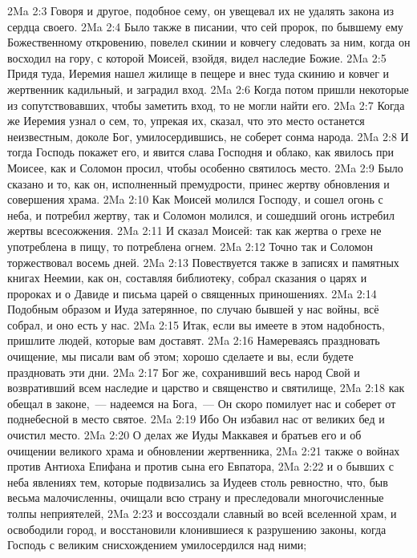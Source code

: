 \vs 2Ma 2:3 Говоря и другое, подобное сему, он увещевал их не удалять закона из сердца своего.
\vs 2Ma 2:4 Было также в писании, что сей пророк, по бывшему ему Божественному откровению, повелел скинии и ковчегу следовать за ним, когда он восходил на гору, с которой Моисей, взойдя, видел наследие Божие.
\vs 2Ma 2:5 Придя туда, Иеремия нашел жилище в пещере и внес туда скинию и ковчег и жертвенник кадильный, и заградил вход.
\vs 2Ma 2:6 Когда потом пришли некоторые из сопутствовавших, чтобы заметить вход, то не могли найти его.
\vs 2Ma 2:7 Когда же Иеремия узнал о сем, то, упрекая их, сказал, что это место останется неизвестным, доколе Бог, умилосердившись, не соберет сонма народа.
\vs 2Ma 2:8 И тогда Господь покажет его, и явится слава Господня и облако, как явилось при Моисее, как и Соломон просил, чтобы особенно святилось место.
\vs 2Ma 2:9 Было сказано и то, как он, исполненный премудрости, принес жертву обновления и совершения храма.
\vs 2Ma 2:10 Как Моисей молился Господу, и сошел огонь с неба, и потребил жертву, так и Соломон молился, и сошедший огонь истребил жертвы всесожжения.
\vs 2Ma 2:11 И сказал Моисей: так как жертва о грехе не употреблена в пищу, то потреблена огнем.
\vs 2Ma 2:12 Точно так и Соломон торжествовал восемь дней.
\rsbpar\vs 2Ma 2:13 Повествуется также в записях и памятных книгах Неемии, как он, составляя библиотеку, собрал сказания о царях и пророках и о Давиде и письма царей о священных приношениях.
\vs 2Ma 2:14 Подобным образом и Иуда затерянное, по случаю бывшей у нас войны, всё собрал, и оно есть у нас.
\vs 2Ma 2:15 Итак, если вы имеете в этом надобность, пришлите людей, которые вам доставят.
\vs 2Ma 2:16 Намереваясь праздновать очищение, мы писали вам об этом; хорошо сделаете и вы, если будете праздновать эти дни.
\vs 2Ma 2:17 Бог же, сохранивший весь народ Свой и возвративший всем наследие и царство и священство и святилище,
\vs 2Ma 2:18 как обещал в законе,~--- надеемся на Бога,~--- Он скоро помилует нас и соберет от поднебесной в место святое.
\vs 2Ma 2:19 Ибо Он избавил нас от великих бед и очистил место.
\vs 2Ma 2:20 О делах же Иуды Маккавея и братьев его и об очищении великого храма и обновлении жертвенника,
\vs 2Ma 2:21 также о войнах против Антиоха Епифана и против сына его Евпатора,
\vs 2Ma 2:22 и о бывших с неба явлениях тем, которые подвизались за Иудеев столь ревностно, что, быв весьма малочисленны, очищали всю страну и преследовали многочисленные толпы неприятелей,
\vs 2Ma 2:23 и воссоздали славный во всей вселенной храм, и освободили город, и восстановили клонившиеся к разрушению законы, когда Господь с великим снисхождением умилосердился над ними;
